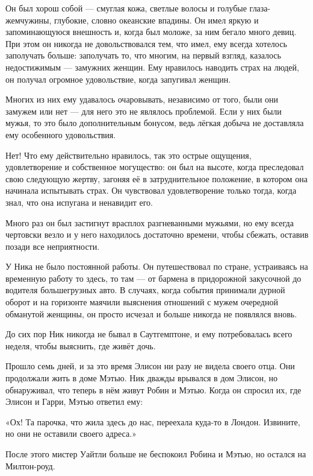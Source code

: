 \documentclass[a4paper,12pt]{book}
\begin{document}
\par
Он был хорош собой — смуглая кожа, светлые волосы и голубые глаза-жемчужины, глубокие, словно океанские впадины. Он имел яркую и запоминающуюся внешность и, когда был моложе, за ним бегало много девиц. При этом он никогда не довольствовался тем, что имел, ему всегда хотелось заполучать больше: заполучать  то, что многим, на первый взгляд, казалось недостижимым — замужних женщин. Ему нравилось наводить страх на людей, он получал огромное удовольствие, когда запугивал женщин.
\par
Многих из них ему удавалось очаровывать, независимо от того, были они замужем или нет — для него это не являлось проблемой. Если у них были мужья, то это было дополнительным бонусом, ведь лёгкая добыча не доставляла ему особенного удовольствия.
\par
Нет! Что ему действительно нравилось, так это острые ощущения, удовлетворение и собственное могущество: он был на высоте, когда преследовал свою следующую жертву, загоняя её в затруднительное положение, в котором она начинала испытывать страх. Он чувствовал удовлетворение только тогда, когда знал, что она испугана и ненавидит его.
\par
Много раз он был застигнут врасплох разгневанными мужьями, но ему всегда чертовски везло и у него находилось достаточно времени, чтобы сбежать, оставив позади все неприятности.
\par
У Ника не было постоянной работы. Он путешествовал по стране, устраиваясь на временную работу то здесь, то там — от бармена в придорожной закусочной до водителя большегрузных авто. В случаях, когда события принимали дурной оборот и на горизонте маячили выяснения отношений с мужем очередной обманутой женщины, он просто исчезал и больше никогда не появлялся вновь.
\par
До сих пор Ник никогда не бывал в Саутгемптоне, и ему потребовалась всего неделя, чтобы выяснить, где живёт дочь.\\
\par
Прошло семь дней, и за это время Элисон ни разу не видела своего отца. Они продолжали жить в доме Мэтью. Ник дважды врывался в дом Элисон, но обнаруживал, что теперь в нём живут Робин и Мэтью. Когда он спросил их, где Элисон и Гарри, Мэтью ответил ему:
\par
«Ох! Та парочка, что жила здесь до нас, переехала куда-то в Лондон. Извините, но они не оставили своего адреса.»
\par
После этого мистер Уайтли больше не беспокоил Робина и Мэтью, но остался на Милтон-роуд.\\
\end{document}
